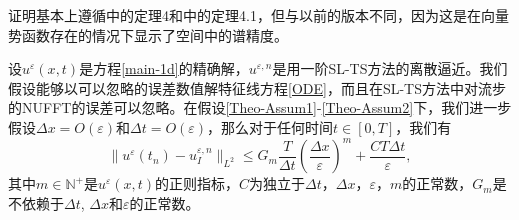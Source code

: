 证明基本上遵循中的定理4和中的定理4.1，但与以前的版本不同，因为这是在向量势函数存在的情况下显示了空间中的谱精度。

\begin{thm}\label{err:est}
	设$u^\varepsilon(x,t)$是方程\eqref{main-1d}的精确解，$u^{\varepsilon,n}$是用一阶SL-TS方法的离散逼近。我们假设能够以可以忽略的误差数值解特征线方程\eqref{ODE}，而且在SL-TS方法中对流步的NUFFT的误差可以忽略。在假设\eqref{Theo-Assum1}-\eqref{Theo-Assum2}下，我们进一步假设$\Delta x=O(\varepsilon)$和$\Delta t=O(\varepsilon)$，那么对于任何时间$t\in[0,T]$，我们有 
	\begin{equation}
	\|u^\varepsilon(t_n)-u^{\varepsilon,n}_I\|_{L^2}\leq G_m\frac{T}{\Delta t}\left(\frac{\Delta x}{\varepsilon}\right)^m+\frac{CT\Delta t}{\varepsilon},
	\end{equation}
	其中$m\in \mathbb N^{+}$是$u^{\varepsilon}(x,t)$的正则指标，$C$为独立于$\Delta t$，$\Delta x$，$\varepsilon$，$m$的正常数，$G_m$是不依赖于$\Delta t$, $\Delta x$和$\varepsilon$的正常数。
\end{thm}
